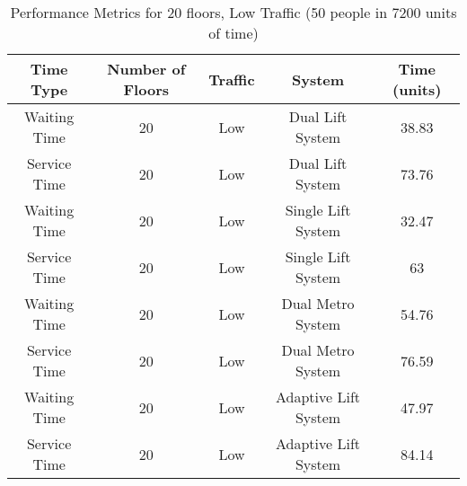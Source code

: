 \documentclass[12pt,a4paper]{report}
\begin{document}
\begin{table}[H]
\centering
\begin{tabular}{|c|c|c|c|c|}
\hline
\textbf{Time Type}    & \textbf{Number of Floors} & \textbf{Traffic} & \textbf{System}     & \textbf{Time (units)} \\ \hline
Waiting Time         & 20                    & Low              & Dual Lift System               & 38.83              \\ \hline
Service Time         & 20                    & Low              & Dual Lift System               & 73.76              \\ \hline
Waiting Time         & 20                    & Low              & Single Lift System& 32.47              \\ \hline
Service Time         & 20                    & Low              & Single Lift System & 63                 \\ \hline
Waiting Time         & 20                    & Low              & Dual Metro System  & 54.76              \\ \hline
Service Time         & 20                    & Low              & Dual Metro System  & 76.59              \\ \hline
Waiting Time         & 20                     & Low         & Adaptive Lift System           & 47.97            \\ \hline
Service Time         & 20                     & Low         & Adaptive Lift System           & 84.14            \\ \hline
\end{tabular}
\caption{Performance Metrics for 20 floors, Low Traffic (50 people in 7200 units of time)}
\end{table}
\end{document}
